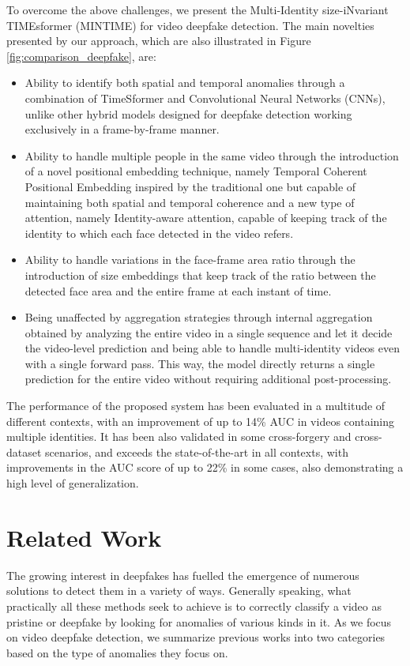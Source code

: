 \documentclass[10pt,twocolumn,letterpaper]{article}
\begin{document}
To overcome the above challenges, we present the Multi-Identity size-iNvariant TIMEsformer (MINTIME) for video deepfake detection. The main novelties presented by our approach, which are also illustrated in Figure \ref{fig:comparison_deepfake}, are:
\begin{itemize}
    \item Ability to identify both spatial and temporal anomalies through a combination of TimeSformer\cite{Bertasius2021IsSA} and Convolutional Neural Networks (CNNs), unlike other hybrid models designed for deepfake detection\cite{10.1145/3549555.3549588,10.1007/978-3-031-06433-3_19} working exclusively in a frame-by-frame manner.
    \item Ability to handle multiple people in the same video through the introduction of a novel positional embedding technique, namely Temporal Coherent Positional Embedding inspired by the traditional one but capable of maintaining both spatial and temporal coherence and a new type of attention, namely Identity-aware attention, capable of keeping track of the identity to which each face detected in the video refers.
    \item Ability to handle variations in the face-frame area ratio through the introduction of size embeddings that keep track of the ratio between the detected face area and the entire frame at each instant of time.
    \item Being unaffected by aggregation strategies through internal aggregation obtained by analyzing the entire video in a single sequence and let it decide the video-level prediction and being able to handle multi-identity videos even with a single forward pass. This way, the model directly returns a single prediction for the entire video without requiring additional post-processing.
\end{itemize}
The performance of the proposed system has been evaluated in a multitude of different contexts, with an improvement of up to 14\% AUC in videos containing multiple identities. It has been also validated in some cross-forgery and cross-dataset scenarios, and exceeds the state-of-the-art in all contexts, with improvements in the AUC score of up to 22\% in some cases, also demonstrating a high level of generalization.

\section{Related Work}
The growing interest in deepfakes has fuelled the emergence of numerous solutions to detect them in a variety of ways\cite{emergence}. Generally speaking, what practically all these methods seek to achieve is to correctly classify a video as pristine or deepfake by looking for anomalies of various kinds in it. 
As we focus on video deepfake detection, we summarize previous works into two categories based on the type of anomalies they focus on.
\end{document}

